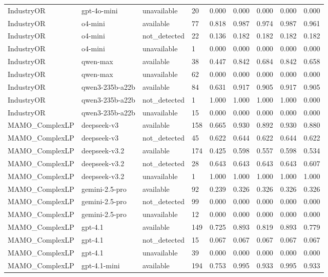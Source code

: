 \begin{table}[t]
\begin{tabular}{lllllllll}
IndustryOR & gpt-4o-mini & unavailable & 20 & 0.000 & 0.000 & 0.000 & 0.000 & 0.000 \\
IndustryOR & o4-mini & available & 77 & 0.818 & 0.987 & 0.974 & 0.987 & 0.961 \\
IndustryOR & o4-mini & not\_detected & 22 & 0.136 & 0.182 & 0.182 & 0.182 & 0.182 \\
IndustryOR & o4-mini & unavailable & 1 & 0.000 & 0.000 & 0.000 & 0.000 & 0.000 \\
IndustryOR & qwen-max & available & 38 & 0.447 & 0.842 & 0.684 & 0.842 & 0.658 \\
IndustryOR & qwen-max & unavailable & 62 & 0.000 & 0.000 & 0.000 & 0.000 & 0.000 \\
IndustryOR & qwen3-235b-a22b & available & 84 & 0.631 & 0.917 & 0.905 & 0.917 & 0.905 \\
IndustryOR & qwen3-235b-a22b & not\_detected & 1 & 1.000 & 1.000 & 1.000 & 1.000 & 0.000 \\
IndustryOR & qwen3-235b-a22b & unavailable & 15 & 0.000 & 0.000 & 0.000 & 0.000 & 0.000 \\
MAMO\_ComplexLP & deepseek-v3 & available & 158 & 0.665 & 0.930 & 0.892 & 0.930 & 0.880 \\
MAMO\_ComplexLP & deepseek-v3 & not\_detected & 45 & 0.622 & 0.644 & 0.622 & 0.644 & 0.622 \\
MAMO\_ComplexLP & deepseek-v3.2 & available & 174 & 0.425 & 0.598 & 0.557 & 0.598 & 0.534 \\
MAMO\_ComplexLP & deepseek-v3.2 & not\_detected & 28 & 0.643 & 0.643 & 0.643 & 0.643 & 0.607 \\
MAMO\_ComplexLP & deepseek-v3.2 & unavailable & 1 & 1.000 & 1.000 & 1.000 & 1.000 & 1.000 \\
MAMO\_ComplexLP & gemini-2.5-pro & available & 92 & 0.239 & 0.326 & 0.326 & 0.326 & 0.326 \\
MAMO\_ComplexLP & gemini-2.5-pro & not\_detected & 99 & 0.000 & 0.000 & 0.000 & 0.000 & 0.000 \\
MAMO\_ComplexLP & gemini-2.5-pro & unavailable & 12 & 0.000 & 0.000 & 0.000 & 0.000 & 0.000 \\
MAMO\_ComplexLP & gpt-4.1 & available & 149 & 0.725 & 0.893 & 0.819 & 0.893 & 0.779 \\
MAMO\_ComplexLP & gpt-4.1 & not\_detected & 15 & 0.067 & 0.067 & 0.067 & 0.067 & 0.067 \\
MAMO\_ComplexLP & gpt-4.1 & unavailable & 39 & 0.000 & 0.000 & 0.000 & 0.000 & 0.000 \\
MAMO\_ComplexLP & gpt-4.1-mini & available & 194 & 0.753 & 0.995 & 0.933 & 0.995 & 0.933 \\

\end{tabular}
\end{table}
